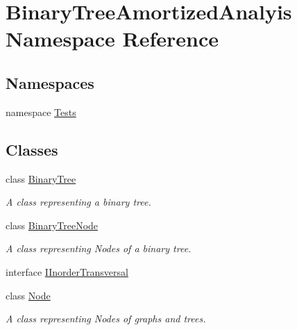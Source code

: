 \hypertarget{namespace_binary_tree_amortized_analyis}{}\section{Binary\+Tree\+Amortized\+Analyis Namespace Reference}
\label{namespace_binary_tree_amortized_analyis}
\subsection*{Namespaces}
\begin{DoxyCompactItemize}
\item 
namespace \hyperlink{namespace_binary_tree_amortized_analyis_1_1_tests}{Tests}
\end{DoxyCompactItemize}
\subsection*{Classes}
\begin{DoxyCompactItemize}
\item 
class \hyperlink{class_binary_tree_amortized_analyis_1_1_binary_tree}{Binary\+Tree}
\begin{DoxyCompactList}\small\item\em A class representing a binary tree. \end{DoxyCompactList}\item 
class \hyperlink{class_binary_tree_amortized_analyis_1_1_binary_tree_node}{Binary\+Tree\+Node}
\begin{DoxyCompactList}\small\item\em A class representing Nodes of a binary tree. \end{DoxyCompactList}\item 
interface \hyperlink{interface_binary_tree_amortized_analyis_1_1_i_inorder_transversal}{I\+Inorder\+Transversal}
\item 
class \hyperlink{class_binary_tree_amortized_analyis_1_1_node}{Node}
\begin{DoxyCompactList}\small\item\em A class representing Nodes of graphs and trees. \end{DoxyCompactList}\end{DoxyCompactItemize}
